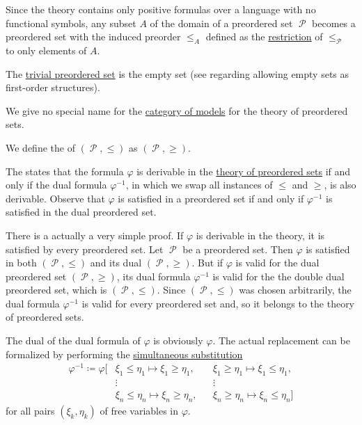 \begin{definition}
\begin{thmenum}
     Since the theory contains only positive formulas over a language with no functional symbols, any subset \( A \) of the domain of a preordered set \( \mscrP \) becomes a preordered set with the induced preorder \( \leq_A \) defined as the \hyperref[def:binary_relation/restriction]{restriction} of \( \leq_\mscrP \) to only elements of \( A \).

     The \hyperref[thm:substructures_form_complete_lattice/bottom]{trivial preordered set} is the empty set (see  regarding allowing empty sets as first-order structures).

     We give no special name for the \hyperref[def:category_of_small_first_order_models]{category of models} for the theory of preordered sets.

     We define the  of \( (\mscrP, \leq) \) as \( (\mscrP, \geq) \).

    The  states that the formula \( \varphi \) is derivable in the \hyperref[def:preordered_set/theory]{theory of preordered sets} if and only if the dual formula \( \varphi^{-1} \), in which we swap all instances of \( \leq \) and \( \geq \), is also derivable. Observe that \( \varphi \) is satisfied in a preordered set if and only if \( \varphi^{-1} \) is satisfied in the dual preordered set.

    There is a actually a very simple proof. If \( \varphi \) is derivable in the theory, it is satisfied by every preordered set. Let \( \mscrP \) be a preordered set. Then \( \varphi \) is satisfied in both \( (\mscrP, \leq) \) and its dual \( (\mscrP, \geq) \). But if \( \varphi \) is valid for the dual preordered set \( (\mscrP, \geq) \), its dual formula \( \varphi^{-1} \) is valid for the the double dual preordered set, which is \( (\mscrP, \leq) \). Since \( (\mscrP, \leq) \) was chosen arbitrarily, the dual formula \( \varphi^{-1} \) is valid for every preordered set and, so it belongs to the theory of preordered sets.

    The dual of the dual formula of \( \varphi \) is obviously \( \varphi \). The actual replacement can be formalized by performing the \hyperref[def:first_order_substitution/term_in_formula]{simultaneous substitution}
    \begin{equation*}
      \begin{aligned}
        \varphi^{-1} \coloneqq \varphi[
          &\xi_1 \leq \eta_1 \mapsto \xi_1 \geq \eta_1, &&\xi_1 \geq \eta_1 \mapsto \xi_1 \leq \eta_1, \\
          &\vdots                                       &&\vdots \\
          &\xi_n \leq \eta_n \mapsto \xi_n \geq \eta_n, &&\xi_n \geq \eta_n \mapsto \xi_n \leq \eta_n]
      \end{aligned}
    \end{equation*}
    for all pairs \( (\xi_k, \eta_k) \) of free variables in \( \varphi \).


\end{thmenum}
\end{definition}

